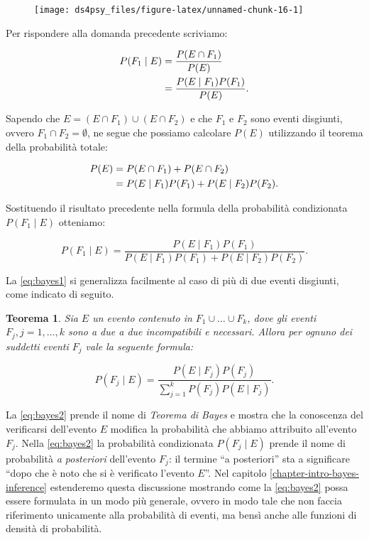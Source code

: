 \documentclass[
  11pt,
]{krantz}
\newtheorem{theorem}{Teorema}[chapter]
\theoremstyle{definition}
\theoremstyle{definition}
\theoremstyle{definition}
\theoremstyle{definition}
\theoremstyle{remark}
\begin{document}
\begin{figure}[h]

{\centering \texttt{[image: ds4psy\_files/figure-latex/unnamed-chunk-16-1]} 

}

\end{figure}

Per rispondere alla domanda precedente scriviamo:

\[
\begin{split}
P(F_1 \mid E) &= \frac{P(E \cap F_1)}{P(E)}\notag\\
              &= \frac{P(E \mid F_1)P(F_1)}{P(E)}.
\end{split}
\]

Sapendo che \(E = (E \cap F_1) \cup (E \cap F_2)\) e che \(F_1\) e \(F_2\) sono eventi disgiunti, ovvero \(F_1 \cap F_2 = \emptyset\), ne segue che possiamo calcolare \(P(E)\) utilizzando il teorema della probabilità totale:

\[
\begin{split}
P(E) &= P(E \cap F_1) + P(E \cap F_2)\notag\\
     &= P(E \mid F_1)P(F_1) + P(E \mid F_2)P(F_2).
\end{split}
\]

\noindent Sostituendo il risultato precedente nella formula della probabilità condizionata \(P(F_1 \mid E)\) otteniamo:

\begin{equation}
P(F_1 \mid E) = \frac{P(E \mid F_1)P(F_1)}{P(E \mid F_1)P(F_1) + P(E \mid F_2)P(F_2)}.
\label{eq:bayes1}
\end{equation}

\noindent La \eqref{eq:bayes1} si generalizza facilmente al caso di più di due eventi disgiunti, come indicato di seguito.

\begin{theorem}
Sia \(E\) un evento contenuto in \(F_1 \cup \dots \cup F_k\), dove gli eventi \(F_j, j=1, \dots, k\) sono a due a due incompatibili e necessari. Allora per ognuno dei suddetti eventi \(F_j\) vale la seguente formula:

\begin{equation}
P(F_j \mid E) = \frac{P(E \mid F_j)P(F_j)}{\sum_{j=1}^{k}P(F_j)P(E \mid F_j)}.
\label{eq:bayes2}
\end{equation}
\end{theorem}

\noindent La \eqref{eq:bayes2} prende il nome di \emph{Teorema di Bayes} e mostra che la conoscenza del verificarsi dell'evento \(E\) modifica la probabilità che abbiamo attribuito all'evento \(F_j\). Nella \eqref{eq:bayes2} la probabilità condizionata \(P(F_j \mid E)\) prende il nome di probabilità \emph{a posteriori} dell'evento \(F_j\): il termine ``a posteriori'' sta a significare ``dopo che è noto che si è verificato l'evento \(E\)''. Nel capitolo \ref{chapter-intro-bayes-inference} estenderemo questa discussione mostrando come la \eqref{eq:bayes2} possa essere formulata in un modo più generale, ovvero in modo tale che non faccia riferimento unicamente alla probabilità di eventi, ma bensì anche alle funzioni di densità di probabilità.
\end{document}
